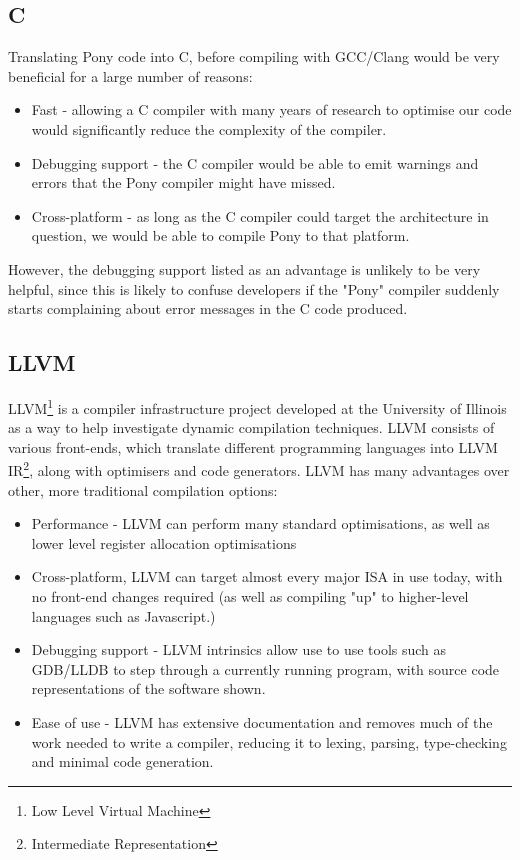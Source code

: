 \documentclass{article}
\begin{document}
\subsection{C}

Translating Pony code into C, before compiling with GCC/Clang would be very beneficial for a large number of reasons:
\begin{itemize}[noitemsep]
\item Fast - allowing a C compiler with many years of research to optimise our code would significantly reduce the complexity of the compiler.
\item Debugging support - the C compiler would be able to emit warnings and errors that the Pony compiler might have missed.
\item Cross-platform - as long as the C compiler could target the architecture in question, we would be able to compile Pony to that platform.
\end{itemize}

However, the debugging support listed as an advantage is unlikely to be very helpful, since this is likely to confuse developers if the "Pony" compiler suddenly starts complaining about error messages in the C code produced.

\subsection{LLVM}

LLVM\footnote{Low Level Virtual Machine} is a compiler infrastructure project developed at the University of Illinois as a way to help investigate dynamic compilation techniques\cite{Lattner:MSThesis02}.
LLVM consists of various front-ends, which translate different programming languages into LLVM IR\footnote{Intermediate Representation}, along with optimisers and code generators.
LLVM has many advantages over other, more traditional compilation options:
\begin{itemize}[noitemsep]
\item Performance - LLVM can perform many standard optimisations, as well as lower level register allocation optimisations
\item Cross-platform, LLVM can target almost every major ISA in use today\cite{llvm-svn}, with no front-end changes required (as well as compiling "up" to higher-level languages such as Javascript.) 
\item Debugging support - LLVM intrinsics allow use to use tools such as GDB/LLDB to step through a currently running program, with source code representations of the software shown.
\item Ease of use - LLVM has extensive documentation and removes much of the work needed to write a compiler, reducing it to lexing, parsing, type-checking and minimal code generation.
\end{itemize}
\end{document}
